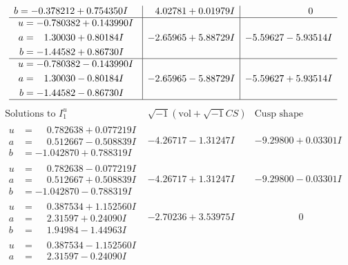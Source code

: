 \documentclass[1p]{elsarticle_modified}
\theoremstyle{definition}
\newcommand{\I}{\sqrt{-1}}
\begin{document}
$$\begin{array}{c|c|c}
\begin{aligned}
b &= -0.378212 + 0.754350 I\end{aligned}
 & \phantom{-}4.02781 + 0.01979 I & \phantom{-0.000000 } 0 \\ \hline\begin{aligned}
u &= -0.780382 + 0.143990 I \\
a &= \phantom{-}1.30030 + 0.80184 I \\
b &= -1.44582 + 0.86730 I\end{aligned}
 & -2.65965 + 5.88729 I & -5.59627 - 5.93514 I \\ \hline\begin{aligned}
u &= -0.780382 - 0.143990 I \\
a &= \phantom{-}1.30030 - 0.80184 I \\
b &= -1.44582 - 0.86730 I\end{aligned}
 & -2.65965 - 5.88729 I & -5.59627 + 5.93514 I\\
 \hline 
 \end{array}$$\newpage$$\begin{array}{c|c|c}  
\text{Solutions to }I^u_{1}& \I (\text{vol} + \sqrt{-1}CS) & \text{Cusp shape}\\
 \hline 
\begin{aligned}
u &= \phantom{-}0.782638 + 0.077219 I \\
a &= \phantom{-}0.512667 - 0.508839 I \\
b &= -1.042870 + 0.788319 I\end{aligned}
 & -4.26717 - 1.31247 I & -9.29800 + 0.03301 I \\ \hline\begin{aligned}
u &= \phantom{-}0.782638 - 0.077219 I \\
a &= \phantom{-}0.512667 + 0.508839 I \\
b &= -1.042870 - 0.788319 I\end{aligned}
 & -4.26717 + 1.31247 I & -9.29800 - 0.03301 I \\ \hline\begin{aligned}
u &= \phantom{-}0.387534 + 1.152560 I \\
a &= \phantom{-}2.31597 + 0.24090 I \\
b &= \phantom{-}1.94984 - 1.44963 I\end{aligned}
 & -2.70236 + 3.53975 I & \phantom{-0.000000 } 0 \\ \hline\begin{aligned}
u &= \phantom{-}0.387534 - 1.152560 I \\
a &= \phantom{-}2.31597 - 0.24090 I \\

\end{aligned}
\end{array}$$
\end{document}
